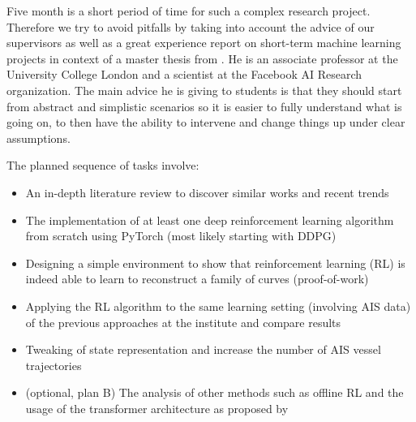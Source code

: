 Five month is a short period of time for such a complex research project. Therefore we try to avoid pitfalls by taking into account the advice of our supervisors as well as a great experience report on short-term machine learning projects in context of a master thesis from \cite{tim2018}. He is an associate professor at the University College London and a scientist at the Facebook AI Research organization. The main advice he is giving to students is that they should start from  abstract and simplistic scenarios so it is easier to fully understand what is going on, to then have the ability to intervene and change things up under clear assumptions.
\par 
The planned sequence of tasks involve:
\begin{itemize}
    \item An in-depth literature review to discover similar works and recent trends
    \item The implementation of at least one deep reinforcement learning algorithm from scratch using PyTorch (most likely starting with DDPG)
    \item Designing a simple environment to show that reinforcement learning (RL) is indeed able to learn to reconstruct a family of curves (proof-of-work) 
    \item Applying the RL algorithm to the same learning setting (involving AIS data) of the previous approaches at the institute and compare results
    \item Tweaking of state representation and increase the number of AIS vessel trajectories
    \item (optional, plan B) The analysis of other methods such as offline RL and the usage of the transformer architecture as proposed by \cite{chen2021decision} 
\end{itemize}